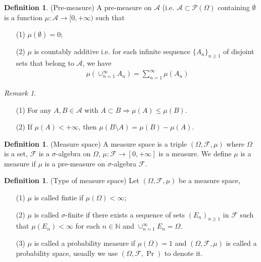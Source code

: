\documentclass[a4paper,11pt]{report}
\theoremstyle{plain} %
\theoremstyle{definition} %
\newtheorem{defn}[thm]{Definition}
\theoremstyle{remark} %
\newtheorem*{rem}{Remark}
\begin{document}
\begin{defn}(Pre-measure) A pre-measure on $\mathcal{A}$ (i.e. $\mathcal{A}\subset \mathcal{P}(\Omega)$ containing $\emptyset$ is a function $\mu:\mathcal{A}\rightarrow [0,+\infty )$ such that
\begin{itemize}
    \item[(1)] $\mu (\emptyset) =0$;
    \item[(2)] $\mu$ is countably additive i.e. for each infinite sequence $\{A_{n}\}_{n\geq1 }$ of disjoint sets that belong to $\mathcal{A}$, we have 
    \begin{align*}
        \mu (\cup_{n=1}^{\infty} A_{n}) = \sum_{n=1}^{\infty} \mu (A_{n})
    \end{align*}
\end{itemize}
\end{defn}

\begin{rem}
    \begin{itemize}
        \item[(1)] For any $A,B\in \mathcal{A}$ with $A\subset B \Rightarrow \mu (A) \leq \mu (B)$.
        \item[(2)] If $\mu (A) < + \infty$, then $\mu (B \setminus A)=\mu (B)- \mu (A)$.
    \end{itemize}
\end{rem}   

\begin{defn}(Measure space) A measure space is a triple $(\Omega, \mathcal{F},\mu)$ where $\Omega$ is a set, $\mathcal{F}$ is a $\sigma$-algebra on $\Omega$, $\mu :\mathcal{F}\rightarrow [0,+\infty]$ is a measure. We define $\mu$ is a measure if $\mu$ is a pre-measure on $\sigma$-algebra $\mathcal{F}$.

\end{defn}

\begin{defn}(Type of measure space) Let $(\Omega, \mathcal{F},\mu)$ be a measure space,
\begin{itemize}
    \item[(1)] $\mu$ is called fintie if $\mu (\Omega) < \infty$;
    \item[(2)] $\mu$ is called $\sigma$-finite if there exists a sequence of sets $(E_{n})_{n\geq 1}$ in $\mathcal{F}$ such that $\mu (E_{n})<\infty$ for each $n\in 
    \mathbb{N}$ and $\cup_{n=1}^{\infty}E_{n}=\Omega$.
    \item[(3)] $\mu$ is called a probability measure if $\mu (\Omega)=1$ and $(\Omega, \mathcal{F},\mu)$ is called a probability space, usually we use $(\Omega, \mathcal{F},\Pr)$ to denote it.
\end{itemize}
\end{defn}
\end{document}
